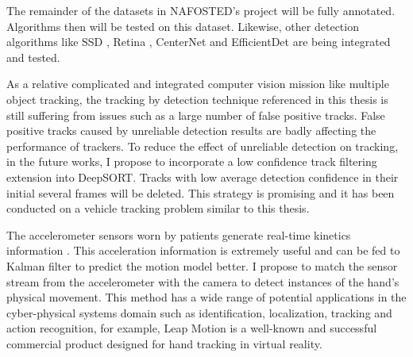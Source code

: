 The remainder of the datasets in NAFOSTED’s project will be fully annotated. Algorithms then will be tested on this dataset. Likewise, other detection algorithms like SSD \cite{DBLP:journals/corr/LiuAESR15}, Retina \cite{8237586}, CenterNet \cite{9010985} and EfficientDet \cite{tan1911efficientdet} are being integrated and tested.

As a relative complicated and integrated computer vision mission like multiple object tracking, the tracking by detection technique referenced in this thesis is still suffering from issues such as a large number of false positive tracks. False positive tracks caused by unreliable detection results are badly affecting the performance of trackers. To reduce the effect of unreliable detection on tracking, in the future works, I propose to incorporate a low confidence track filtering extension into DeepSORT. Tracks with low average detection confidence in their initial several frames will be deleted. This strategy is promising and it has been conducted on a vehicle tracking problem \cite{8909903} similar to this thesis.

The accelerometer sensors worn by patients generate real-time kinetics information \cite{4651201}. This acceleration information is extremely useful and can be fed to Kalman filter to predict the motion model better. I propose to match the sensor stream from the accelerometer with the camera to detect instances of the hand’s physical movement. This method has a wide range of potential applications in the cyber-physical systems domain such as identification, localization, tracking and action recognition, for example, Leap Motion \cite{8711887} is a well-known and successful commercial product designed for hand tracking in virtual reality.